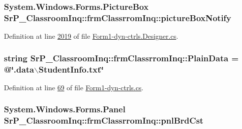 \hypertarget{class_sr_p___classroom_inq_1_1frm_classrrom_inq_a42edbcd46f526414f654285ab552b75b}{
\subsubsection[{picture\-Box\-Notify}]{\setlength{\rightskip}{0pt plus 5cm}\-System.\-Windows.\-Forms.\-Picture\-Box {\bf \-Sr\-P\-\_\-\-Classroom\-Inq\-::frm\-Classrrom\-Inq\-::picture\-Box\-Notify}}}
\label{class_sr_p___classroom_inq_1_1frm_classrrom_inq_a42edbcd46f526414f654285ab552b75b}


\-Definition at line \hyperlink{_form1-dyn-ctrls_8_designer_8cs_source_l02019}{2019} of file \hyperlink{_form1-dyn-ctrls_8_designer_8cs_source}{\-Form1-\/dyn-\/ctrls.\-Designer.\-cs}.

\hypertarget{class_sr_p___classroom_inq_1_1frm_classrrom_inq_a511d08cf3bdc5282be448f0513bbd262}{
\subsubsection[{\-Plain\-Data}]{\setlength{\rightskip}{0pt plus 5cm}string {\bf \-Sr\-P\-\_\-\-Classroom\-Inq\-::frm\-Classrrom\-Inq\-::\-Plain\-Data} = @\char`\"{}.data$\backslash$\-Student\-Info.\-txt\char`\"{}}}
\label{class_sr_p___classroom_inq_1_1frm_classrrom_inq_a511d08cf3bdc5282be448f0513bbd262}


\-Definition at line \hyperlink{_form1-dyn-ctrls_8cs_source_l00069}{69} of file \hyperlink{_form1-dyn-ctrls_8cs_source}{\-Form1-\/dyn-\/ctrls.\-cs}.

\hypertarget{class_sr_p___classroom_inq_1_1frm_classrrom_inq_ac9c46f730b0cfb6a131875ede890b86d}{
\subsubsection[{pnl\-Brd\-Cst}]{\setlength{\rightskip}{0pt plus 5cm}\-System.\-Windows.\-Forms.\-Panel {\bf \-Sr\-P\-\_\-\-Classroom\-Inq\-::frm\-Classrrom\-Inq\-::pnl\-Brd\-Cst}}}
\label{class_sr_p___classroom_inq_1_1frm_classrrom_inq_ac9c46f730b0cfb6a131875ede890b86d}


